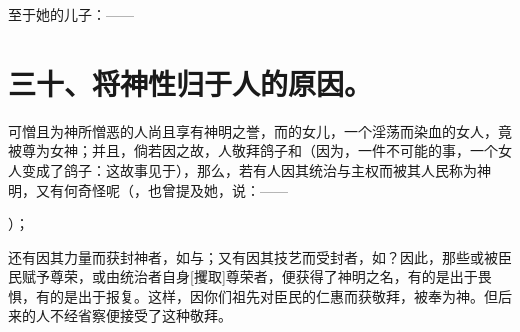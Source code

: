 \par

至于她的儿子：——\par

\par


\section{三十、将神性归于人的原因。}

可憎且为神所憎恶的人尚且享有神明之誉，而的女儿，一个淫荡而染血的女人，竟被尊为女神；并且，倘若因之故，人敬拜鸽子和（因为，一件不可能的事，一个女人变成了鸽子：这故事见于），那么，若有人因其统治与主权而被其人民称为神明，又有何奇怪呢（，也曾提及她，说：——\par

）；\par

还有因其力量而获封神者，如与；又有因其技艺而受封者，如？因此，那些或被臣民赋予尊荣，或由统治者自身[攫取]尊荣者，便获得了神明之名，有的是出于畏惧，有的是出于报复。这样，因你们祖先对臣民的仁惠而获敬拜，被奉为神。但后来的人不经省察便接受了这种敬拜。\par

\par

